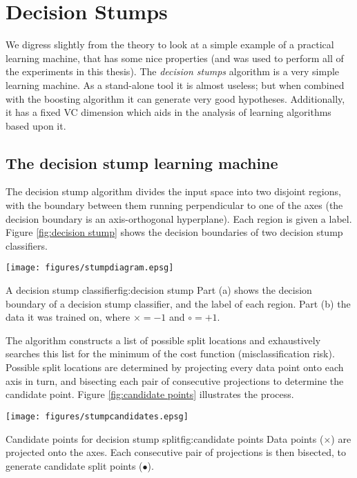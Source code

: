 
\chapter{Decision Stumps}
\label{chapter:stumps}

We digress slightly from the theory to look at a simple example of a
practical learning machine, that has some nice properties (and was used
to perform all of the experiments in this thesis).
The \emph{decision stumps} algorithm is a very simple learning
machine.  As a stand-alone tool it is almost useless; but when
combined with the boosting algorithm it can generate very good
hypotheses.  Additionally, it has a fixed VC dimension which aids in
the analysis of learning algorithms based upon it.

\section{The decision stump learning machine}

The decision stump algorithm divides the input space into two disjoint
regions, with the boundary between them running perpendicular to one
of the axes (the decision boundary is an axis-orthogonal hyperplane).
Each region is given a label.  Figure \ref{fig:decision stump} shows
the decision boundaries of two decision stump classifiers.

\begin{linefigure}
\begin{center}
\texttt{[image: figures/stumpdiagram.epsg]}
\end{center}
\begin{capt}{A decision stump classifier}{fig:decision stump}
Part (a) shows the decision boundary of a decision stump classifier,
and the label of each region.  Part (b) the data it was trained on,
where $\times = -1$ and $\circ = +1$.
\end{capt}
\end{linefigure}

The algorithm constructs a list of possible split locations and
exhaustively searches this list for the minimum of the cost function
(misclassification risk).  Possible split locations are determined by
projecting every data point onto each axis in turn, and bisecting each
pair of consecutive projections to determine the candidate point.
Figure \ref{fig:candidate points} illustrates the process.

\begin{linefigure}
\begin{center}
\texttt{[image: figures/stumpcandidates.epsg]}
\end{center}
\begin{capt}{Candidate points for decision stump split}{fig:candidate points}
Data points ($\times$) are projected onto the axes.  Each consecutive
pair of projections is then bisected, to generate candidate split
points ($\bullet$).
\end{capt}
\end{linefigure}

